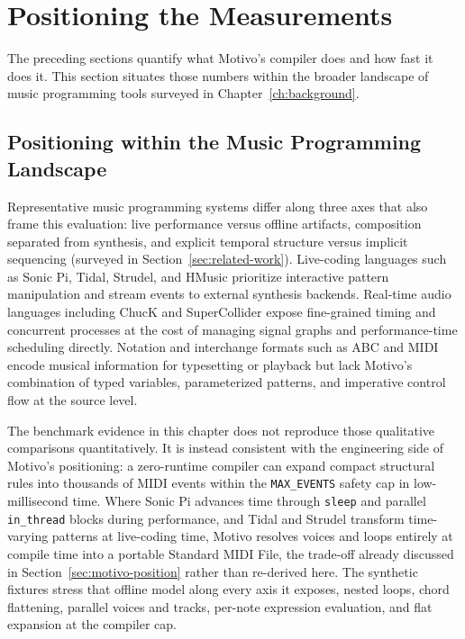 \section{Positioning the Measurements}\label{sec:comparative-interpretation}

The preceding sections quantify what Motivo's compiler does and how fast it does it.
This section situates those numbers within the broader landscape of music programming tools surveyed in
Chapter~\ref{ch:background}.

\subsection{Positioning within the Music Programming Landscape}\label{detail-subsec:positioning-dsl-ecosystem}

Representative music programming systems differ along three axes that also frame this evaluation: live performance
versus offline artifacts, composition separated from synthesis, and explicit temporal structure versus implicit
sequencing (surveyed in Section~\ref{sec:related-work}).
Live-coding languages such as Sonic Pi, Tidal, Strudel, and HMusic prioritize interactive pattern manipulation and
stream events to external synthesis backends.
Real-time audio languages including ChucK and SuperCollider expose fine-grained timing and concurrent processes at the
cost of managing signal graphs and performance-time scheduling directly.
Notation and interchange formats such as ABC and MIDI encode musical information for typesetting or playback but lack
Motivo's combination of typed variables, parameterized patterns, and imperative control flow at the source level.

The benchmark evidence in this chapter does not reproduce those qualitative comparisons quantitatively.
It is instead consistent with the engineering side of Motivo's positioning: a zero-runtime compiler can expand compact
structural rules into thousands of MIDI events within the \texttt{MAX\_EVENTS} safety cap in low-millisecond time.
Where Sonic Pi advances time through \texttt{sleep} and parallel \texttt{in\_thread} blocks during performance, and
Tidal and Strudel transform time-varying patterns at live-coding time, Motivo resolves voices and loops entirely at
compile time into a portable Standard MIDI File, the trade-off already discussed in Section~\ref{sec:motivo-position}
rather than re-derived here.
The synthetic fixtures stress that offline model along every axis it exposes, nested loops, chord flattening, parallel
voices and tracks, per-note expression evaluation, and flat expansion at the compiler cap.


